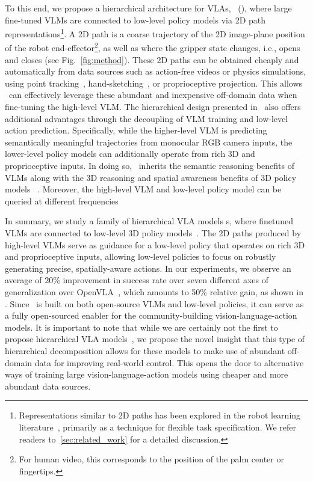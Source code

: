 To this end, we propose a hierarchical architecture for VLAs, \method\ (\methodlong), where large fine-tuned VLMs are connected to low-level policy models via 2D path representations\footnote{Representations similar to 2D paths has been explored in the robot learning literature~\citep{gu2023rttrajectory}, primarily as a technique for flexible task specification. We refer readers to~\cref{sec:related_work} for a detailed discussion.}. A 2D path is a coarse trajectory of the 2D image-plane position of the robot end-effector\footnote{For human video, this corresponds to the position of the palm center or fingertips.}, as well as where the gripper state changes, i.e., opens and closes (see Fig.~\ref{fig:method}). These 2D paths can be obtained cheaply and automatically from data sources such as action-free videos or physics simulations, using point tracking~\citep{doersch2023tapir,karaev2025cotracker}, hand-sketching~\citep{gu2023rttrajectory}, or proprioceptive projection. This allows \method\ can effectively leverage these abundant and inexpensive off-domain data when fine-tuning the high-level VLM. 
The hierarchical design presented in \method\ also offers additional advantages through the decoupling of VLM training and low-level action prediction. Specifically, while the higher-level VLM is predicting semantically meaningful trajectories from monocular RGB camera inputs, the lower-level policy models can additionally operate from rich 3D and proprioceptive inputs. In doing so, \method\ inherits the semantic reasoning benefits of VLMs along with the 3D reasoning and spatial awareness benefits of 3D policy models ~\citep{goyal2024rvt, ke20243d}. Moreover, the high-level VLM and low-level policy model can be queried at different frequencies 

In summary, we study a family of hierarchical VLA models \method s, where finetuned VLMs are connected to low-level 3D policy models~\citep{goyal2024rvt,ke20243d}. The 2D paths produced by high-level VLMs serve as guidance for a low-level policy that operates on rich 3D and proprioceptive inputs, allowing low-level policies to focus on robustly generating precise, spatially-aware actions. In our experiments, we observe an average of 20\% improvement in success rate over seven different axes of generalization over OpenVLA~\citep{kim2024openvla}, which amounts to 50\% relative gain, as shown in . Since \method\ is built on both open-source VLMs and low-level policies, it can serve as a fully open-sourced enabler for the community-building vision-language-action models. It is important to note that while we are certainly not the first to propose hierarchical VLA models~\citep{gu2023rttrajectory, nasiriany2024rt}, we propose the novel insight that this type of hierarchical decomposition allows for these models to make use of abundant off-domain data for improving real-world control. This opens the door to alternative ways of training large vision-language-action models using cheaper and more abundant data sources. 